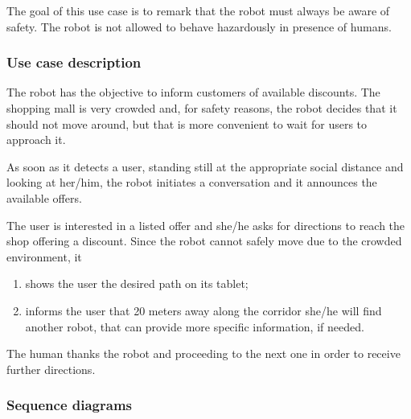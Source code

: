The goal of this use case is to remark that the robot must always be
aware of safety. The robot is not allowed to behave hazardously
in presence of humans.

\subsubsection{Use case description}

The robot has the objective to inform customers of available discounts.
The shopping mall is very crowded and, for safety
reasons, the robot decides that it should not move around, but
that is more convenient to wait
for users to approach it.

As soon as it detects a user, standing still at
the appropriate social distance and looking at her/him, the robot initiates
a conversation and it announces the available offers.

The user is interested in a listed offer
and she/he asks for directions to reach the shop offering a discount.
Since the robot cannot safely move due to the crowded environment, it
\begin{enumerate}
\item shows the user the desired path on its tablet;
\item informs the user that 20 meters away along the corridor she/he will find another robot,
that can provide more specific information, if needed.
\end{enumerate}

\noindent The human thanks the robot and proceeding to the next one in order to
receive further directions.

\subsubsection{Sequence diagrams}

